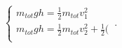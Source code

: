 \begin{equation}
    \begin{cases}
      m_{tot} g h = \frac{1}{2} m_{tot} v_1^2\\
      m_{tot} g h = \frac{1}{2} m_{tot} v_2^2 + \frac{1}{2}(\\
    \end{cases}\,.
\end{equation}